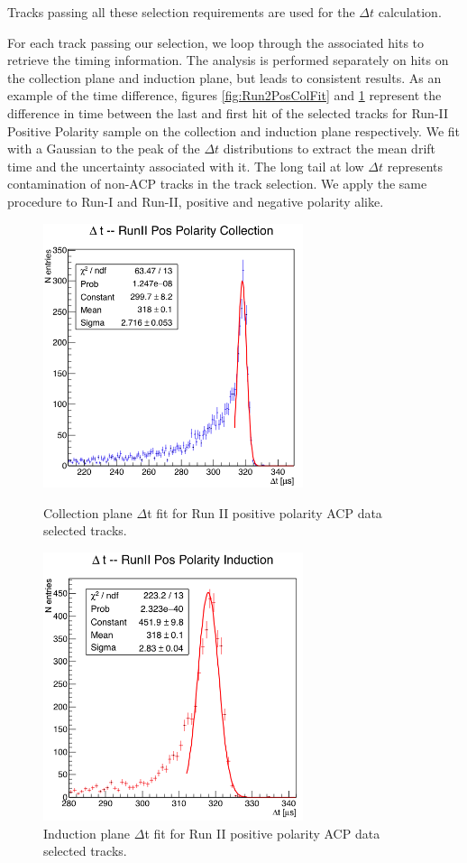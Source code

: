 Tracks passing all these selection requirements are used for the $\Delta t$ calculation.

For each track passing our selection, we loop through the associated hits to retrieve the timing information. The analysis is performed separately on hits on the collection plane and induction plane, but leads to consistent results. As an example of the time difference, figures \ref{fig:Run2PosColFit} and \ref{fig:Run2PosIndFit} represent the difference in time between the last and first hit of the selected tracks for Run-II Positive Polarity sample on the collection and induction plane respectively.  We fit with a Gaussian to the peak of the $\Delta t$ distributions to extract the mean drift time and the uncertainty associated with it. The long tail at low $\Delta t$ represents contamination of non-ACP tracks in the track selection.  We apply the same procedure to Run-I and Run-II, positive and negative polarity alike.

   
\begin{figure}[h!]
\begin{minipage}{0.40\textwidth}
\centering
\includegraphics[width=3in]{AppendixB-EField/Images/RunIIPosCol.png}
\caption{Collection plane $\Delta$t fit for Run II positive polarity ACP data  selected tracks.}
\label{fig:Run2PosColFit}
\end{minipage}\hfill
\begin{minipage}{0.40\textwidth}
\centering
\includegraphics[width=3in]{AppendixB-EField/Images/RunIIPosInd.png}
\caption{Induction plane $\Delta$t fit for Run II positive polarity ACP data  selected tracks.}
\label{fig:Run2PosIndFit}
\end{minipage}
\end{figure}

